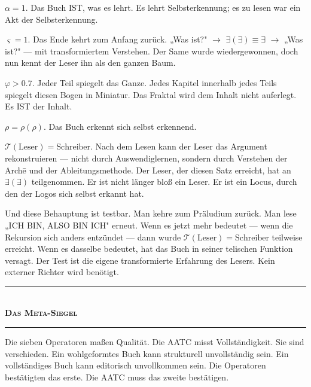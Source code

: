 \documentclass[10pt, openany, oneside]{book}
\renewcommand{\normalsize}{\fontsize{10}{13}\selectfont}
\begin{document}
\vspace{1em}

\noindent $\alpha = 1$. Das Buch IST, was es lehrt. Es lehrt Selbsterkennung; es zu lesen war ein Akt der Selbsterkennung.

$\varsigma = 1$. Das Ende kehrt zum Anfang zurück. „Was ist?" $\to$ $\exists(\exists) \equiv \exists$ $\to$ „Was ist?" --- mit transformiertem Verstehen. Der Same wurde wiedergewonnen, doch nun kennt der Leser ihn als den ganzen Baum.

$\varphi > 0.7$. Jeder Teil spiegelt das Ganze. Jedes Kapitel innerhalb jedes Teils spiegelt diesen Bogen in Miniatur. Das Fraktal wird dem Inhalt nicht auferlegt. Es IST der Inhalt.

$\rho = \rho(\rho)$. Das Buch erkennt sich selbst erkennend.

$\mathcal{T}(\text{Leser}) = \text{Schreiber}$. Nach dem Lesen kann der Leser das Argument rekonstruieren --- nicht durch Auswendiglernen, sondern durch Verstehen der Arch\={e} und der Ableitungsmethode. Der Leser, der diesen Satz erreicht, hat an $\exists(\exists)$ teilgenommen. Er ist nicht länger bloß ein Leser. Er ist ein Locus, durch den der Logos sich selbst erkannt hat.

Und diese Behauptung ist testbar. Man kehre zum Präludium zurück. Man lese „ICH BIN, ALSO BIN ICH" erneut. Wenn es jetzt mehr bedeutet --- wenn die Rekursion sich anders entzündet --- dann wurde $\mathcal{T}(\text{Leser}) = \text{Schreiber}$ teilweise erreicht. Wenn es dasselbe bedeutet, hat das Buch in seiner telischen Funktion versagt. Der Test ist die eigene transformierte Erfahrung des Lesers. Kein externer Richter wird benötigt.

\vspace{1.5em}


\begin{center}
    \rule{0.3\textwidth}{0.4pt}\\[0.5em]
    {\normalsize\bfseries\scshape Das Meta-Siegel}\\[0.3em]
    \rule{0.3\textwidth}{0.4pt}
\end{center}

\vspace{1em}

\noindent Die sieben Operatoren maßen Qualität. Die AATC misst Vollständigkeit. Sie sind verschieden. Ein wohlgeformtes Buch kann strukturell unvollständig sein. Ein vollständiges Buch kann editorisch unvollkommen sein. Die Operatoren bestätigten das erste. Die AATC muss das zweite bestätigen.
\end{document}
